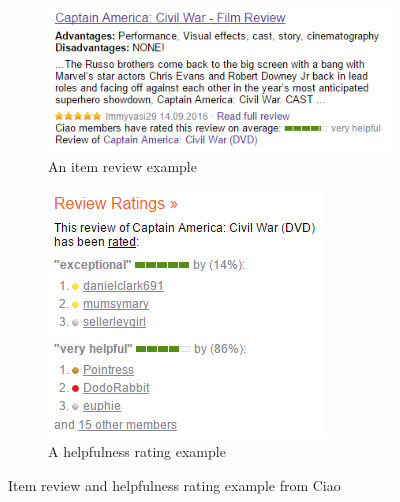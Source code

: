 \documentclass[master,english,final]{kaist-ucs}
\begin{document}
\begin{figure}
    \centering
    \begin{subfigure}[b]{0.66\textwidth}
        \centering
        \includegraphics[width=\linewidth]{figure/item_review_example}
        \caption{An item review example}
        \label{item_review_example}
    \end{subfigure}
    \begin{subfigure}[b]{0.33\textwidth}
        \centering
        \includegraphics[width=\linewidth]{figure/helpfulness_rating_example}
        \caption{A helpfulness rating example}
        \label{item_review_example}
    \end{subfigure}
    \caption{Item review and helpfulness rating example from Ciao}
    \label{real_world_example}
\end{figure}


%
\end{document}
